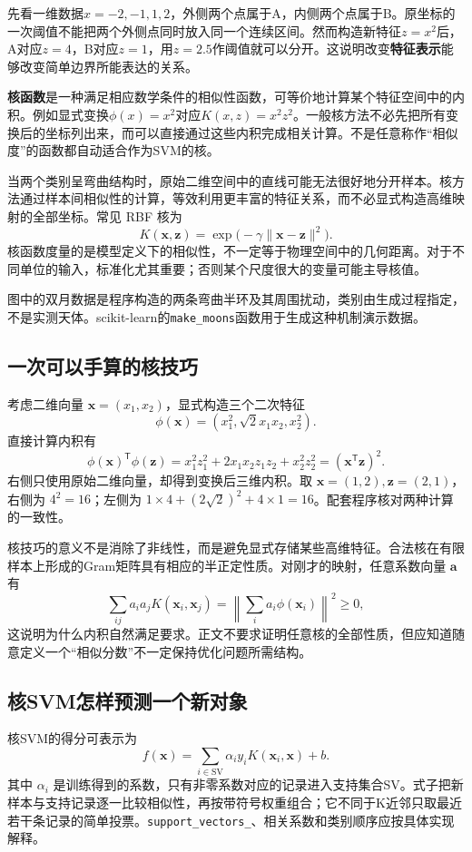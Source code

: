 先看一维数据$x=-2,-1,1,2$，外侧两个点属于A，内侧两个点属于B。原坐标的一次阈值不能把两个外侧点同时放入同一个连续区间。然而构造新特征$z=x^2$后，A对应$z=4$，B对应$z=1$，用$z=2.5$作阈值就可以分开。这说明改变\textbf{特征表示}能够改变简单边界所能表达的关系。

\textbf{核函数}是一种满足相应数学条件的相似性函数，可等价地计算某个特征空间中的内积。例如显式变换$\phi(x)=x^2$对应$K(x,z)=x^2z^2$。一般核方法不必先把所有变换后的坐标列出来，而可以直接通过这些内积完成相关计算。不是任意称作“相似度”的函数都自动适合作为SVM的核。

当两个类别呈弯曲结构时，原始二维空间中的直线可能无法很好地分开样本。核方法通过样本间相似性的计算，等效利用更丰富的特征关系，而不必显式构造高维映射的全部坐标。常见 RBF 核为
\begin{equation}
K(\mathbf x,\mathbf z)=\exp\bigl(-\gamma\|\mathbf x-\mathbf z\|^2\bigr).
\end{equation}
核函数度量的是模型定义下的相似性，不一定等于物理空间中的几何距离。对于不同单位的输入，标准化尤其重要；否则某个尺度很大的变量可能主导核值。

图中的双月数据是程序构造的两条弯曲半环及其周围扰动，类别由生成过程指定，不是实测天体。scikit-learn的\texttt{make\_moons}函数用于生成这种机制演示数据。


\subsection{一次可以手算的核技巧}
考虑二维向量 $\mathbf x=(x_1,x_2)$，显式构造三个二次特征
\[
\phi(\mathbf x)=(x_1^2,\sqrt2x_1x_2,x_2^2).
\]
直接计算内积有
\[
\phi(\mathbf x)^\mathsf T\phi(\mathbf z)
=x_1^2z_1^2+2x_1x_2z_1z_2+x_2^2z_2^2
=(\mathbf x^\mathsf T\mathbf z)^2.
\]
右侧只使用原始二维向量，却得到变换后三维内积。取 $\mathbf x=(1,2),\mathbf z=(2,1)$，右侧为 $4^2=16$；左侧为 $1\times4+(2\sqrt2)^2+4\times1=16$。配套程序核对两种计算的一致性。

核技巧的意义不是消除了非线性，而是避免显式存储某些高维特征。合法核在有限样本上形成的Gram矩阵具有相应的半正定性质。对刚才的映射，任意系数向量 $\mathbf a$ 有
\[
\sum_{ij}a_i a_jK(\mathbf x_i,\mathbf x_j)
=\left\|\sum_i a_i\phi(\mathbf x_i)\right\|^2\geq0,
\]
这说明为什么内积自然满足要求。正文不要求证明任意核的全部性质，但应知道随意定义一个“相似分数”不一定保持优化问题所需结构。

\subsection{核SVM怎样预测一个新对象}
核SVM的得分可表示为
\[
f(\mathbf x)=\sum_{i\in\mathrm{SV}}\alpha_i y_iK(\mathbf x_i,\mathbf x)+b.
\]
其中 $\alpha_i$ 是训练得到的系数，只有非零系数对应的记录进入支持集合SV。式子把新样本与支持记录逐一比较相似性，再按带符号权重组合；它不同于K近邻只取最近若干条记录的简单投票。\texttt{support\_vectors\_}、相关系数和类别顺序应按具体实现解释。

